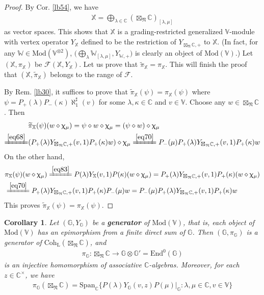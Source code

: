 \documentclass[11pt,b5paper,notitlepage]{article}
\theoremstyle{definition}
\theoremstyle{plain}
\newtheorem{co}[df]{Corollary}
\newcommand{\wtd}{\widetilde}
\newcommand{\End}{\mathrm{End}} %
\newcommand{\Span}{\mathrm{Span}}
\newcommand{\Vbb}{\mathbb V}
\newcommand{\Xbb}{\mathbb X}
\newcommand{\Wbb}{\mathbb W}
\newcommand{\Gbb}{\mathbb G}
\newcommand{\Cbb}{\mathbb C}
\newcommand{\<}{\left\langle}
\renewcommand{\>}{\right\rangle}
\newcommand{\SF}{\mathscr{F}}
\newcommand{\Mod}{\mathrm{Mod}}
\newcommand{\fn}{\mathfrak{N}}
\newcommand{\Coh}{{\mathrm{Coh}_{\mathrm L}}}
\numberwithin{equation}{section}
\begin{document}
\begin{proof}
By Cor. \ref{lb54}, we have
\begin{align*}
\Xbb=\bigoplus_{\lambda\in\Cbb}(\boxtimes_\fn\Cbb)_{[\lambda,\mu]}
\end{align*}
as vector spaces. This shows that $\Xbb$ is a grading-restricted generalized $\Vbb$-module with vertex operator $Y_\Xbb$ defined to be the restriction of $Y_{\boxtimes_\fn\Cbb,+}$ to $\Xbb$. (In fact, for any $\Wbb\in\Mod(\Vbb^{\otimes 2})$, $\big(\bigoplus_\lambda\Wbb_{[\lambda,\mu]},Y_{\Wbb,+}\big)$ is clearly an object of $\Mod(\Vbb)$.) Let $(\Xbb,\pi_\Xbb)$ be $\SF(\Xbb,Y_\Xbb)$. Let us prove that $\wtd\pi_\Xbb=\pi_\Xbb$. This will finish the proof that $(\Xbb,\wtd\pi_\Xbb)$ belongs to the range of $\SF$.


By Rem. \ref{lb30}, it suffices to prove that $\wtd\pi_\Xbb(\psi)=\pi_\Xbb(\psi)$ where $\psi=P_+(\lambda)P_-(\kappa)\aleph_1^\sharp(v)$ for some $\lambda,\kappa\in\Cbb$ and $v\in\Vbb$. Choose any $w\in\boxtimes_\fn\Cbb$. Then
\begin{align*}
&\wtd\pi_\Xbb(\psi)(w\diamond \upchi_\mu)=\psi\diamond w\diamond \upchi_\mu=(\psi\diamond w)\diamond \upchi_\mu\\
\xlongequal{\eqref{eq68}}&(P_+(\lambda)Y_{\boxtimes_\fn\Cbb,+}(v,1)P_+(\kappa)w)\diamond\upchi_\mu\xlongequal{\eqref{eq70}}P_-(\mu)P_+(\lambda)Y_{\boxtimes_\fn\Cbb,+}(v,1)P_+(\kappa)w
\end{align*}
On the other hand,
\begin{align*}
&\pi_\Xbb(\psi)(w\diamond \upchi_\mu)\xlongequal{\eqref{eq83}}P(\lambda)Y_\Xbb(v,1)P(\kappa)(w\diamond\upchi_\mu)=P_+(\lambda)Y_{\boxtimes_\fn\Cbb,+}(v,1)P_+(\kappa)(w\diamond\upchi_\mu)\\
&\xlongequal{\eqref{eq70}}P_+(\lambda)Y_{\boxtimes_\fn\Cbb,+}(v,1)P_+(\kappa)P_-(\mu)w=P_-(\mu)P_+(\lambda)Y_{\boxtimes_\fn\Cbb,+}(v,1)P_+(\kappa)w
\end{align*}
This proves $\wtd\pi_\Xbb(\psi)=\pi_\Xbb(\psi)$.
\end{proof}



\begin{co}\label{lb58}
Let $(\Gbb,Y_\Gbb)$ be a \textbf{generator} of $\Mod(\Vbb)$, that is, each object of $\Mod(\Vbb)$ has an epimorphism from a finite direct sum of $\Gbb$. Then $(\Gbb,\pi_\Gbb)$ is a generator of $\Coh(\boxtimes_\fn\Cbb)$, and 
\begin{align}\label{eq75}
	\pi_\Gbb:\boxtimes_\fn\Cbb\rightarrow \Gbb\otimes \Gbb'=\End^0(\Gbb)
\end{align} 
is an injective homomorphism of associative $\Cbb$-algebras. Moreover, for each $z\in\Cbb^\times$, we have
\begin{align}\label{eq77}
\pi_\Gbb(\boxtimes_\fn\Cbb)=\Span_\Cbb\big\{P(\lambda)Y_\Gbb(v,z)P(\mu)\big|_\Gbb:\lambda,\mu\in\Cbb,v\in\Vbb\big\}
\end{align}
\end{co}
\end{document}
